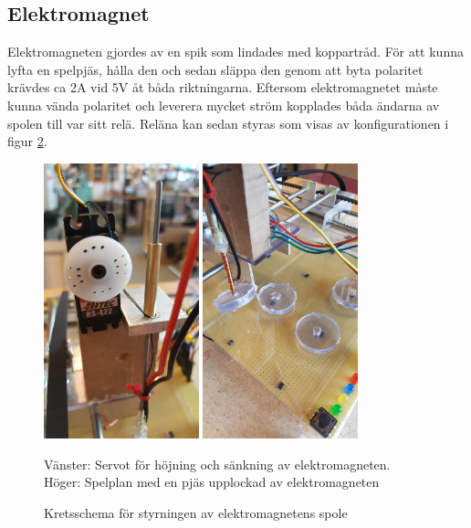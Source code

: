 \documentclass[a4paper]{article}
\begin{document}
\subsection{Elektromagnet}
Elektromagneten gjordes av en spik som lindades med koppartråd.
För att kunna lyfta en spelpjäs, hålla den och sedan släppa den genom att byta polaritet krävdes ca 2A vid 5V åt båda riktningarna.
Eftersom elektromagnetet måste kunna vända polaritet och leverera mycket ström kopplades båda ändarna av spolen till var sitt relä.
Reläna kan sedan styras som visas av konfigurationen i figur \ref{relay}.
\begin{figure}
\centering
\includegraphics[width=0.4\textwidth,keepaspectratio]{../images/servo_fram}
\includegraphics[width=0.4\textwidth,keepaspectratio]{../images/elektromagnet}
\caption{Vänster: Servot för höjning och sänkning av elektromagneten. Höger: Spelplan med en pjäs upplockad av elektromagneten}
\label{servo_fram}
\end{figure}
\begin{figure}
\centering
\caption{Kretsschema för styrningen av elektromagnetens spole}
\label{relay}
\end{figure}
\end{document}
